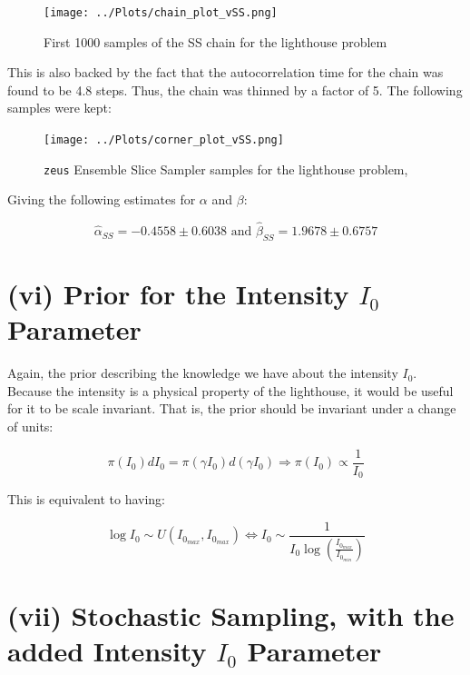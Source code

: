 \documentclass[12pt]{report} %
\begin{document}
\begin{figure}[h]
    \centering
    \texttt{[image: ../Plots/chain\_plot\_vSS.png]}
    \caption{First 1000 samples of the SS chain for the lighthouse problem}
    \label{fig:SS_convergence}
    \end{figure}

This is also backed by the fact that the autocorrelation time for the chain was found to be 4.8 steps. Thus, the chain was thinned by a factor of 5. The following samples were kept:

\newpage

\begin{figure}[h]
\centering
\texttt{[image: ../Plots/corner\_plot\_vSS.png]}
\caption{\texttt{zeus} Ensemble Slice Sampler samples for the lighthouse problem, }
\label{fig:SS_samples}
\end{figure}


Giving the following estimates for $\alpha$ and $\beta$:

\begin{equation}
    \hat{\alpha}_{SS} = -0.4558 \pm 0.6038 \text{ and } \hat{\beta}_{SS} = 1.9678 \pm 0.6757
\end{equation}

\chapter{(vi) Prior for the Intensity $I_{0}$ Parameter}

Again, the prior describing the knowledge we have about the intensity $I_{0}$. Because the intensity is a physical property of the lighthouse, it would be useful for it to be scale invariant. That is, the prior should be invariant under a change of units:

\begin{equation}
    \pi(I_{0}) dI_{0} = \pi(\gamma I_{0}) d(\gamma I_{0}) \Rightarrow \pi(I_{0}) \propto \frac{1}{I_{0}}
\end{equation}

This is equivalent to having:

\begin{equation}
    \log I_{0} \sim U(I_{0_{max}}, I_{0_{max}})  \iff I_{0} \sim \frac{1}{I_{0} \log(\frac{I_{0_{max}}}{I_{0_{min}}})}
\end{equation}


\chapter{(vii) Stochastic Sampling, with the added Intensity $I_{0}$ Parameter}
\end{document}
